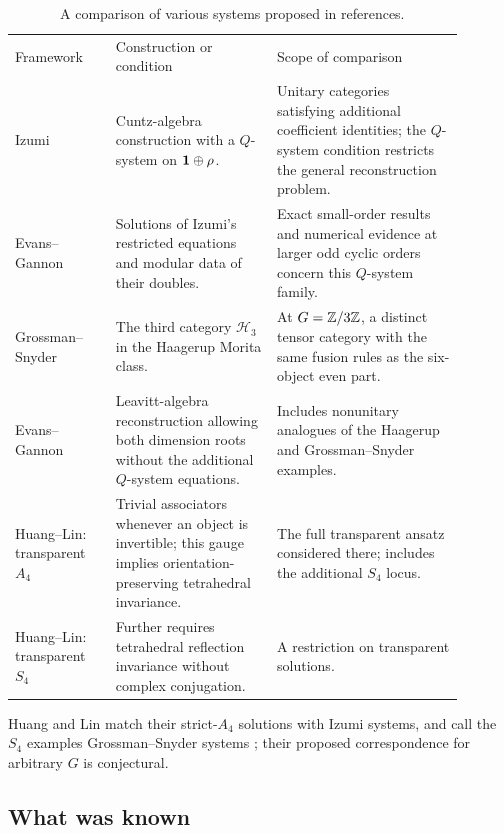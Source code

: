 \begin{table}[htbp]
\centering
\small
\setlength{\tabcolsep}{4pt}
\begin{tabular}{|p{0.20\linewidth}|p{0.32\linewidth}|p{0.37\linewidth}|}
\hline
Framework & Construction or condition & Scope of comparison\\
\hhline{|=|=|=|}
Izumi \cite{Izumi2}
& Cuntz-algebra construction with a $Q$-system on $\mathbf1\oplus\rho$.
& Unitary categories satisfying additional coefficient identities;
  the $Q$-system condition restricts the general reconstruction problem.\\
\hline
Evans--Gannon \cite{EG2011}
& Solutions of Izumi's restricted equations and modular data of their doubles.
& Exact small-order results and numerical evidence at larger odd cyclic
  orders concern this $Q$-system family.\\
\hline
\raggedright Grossman--Snyder \cite{GS}
& \raggedright The third category $\mathcal H_3$ in the Haagerup Morita class.
& At $G=\mathbb Z/3\mathbb Z$, a distinct tensor category with the same fusion
  rules as the six-object even part.\\
\hline
Evans--Gannon \cite{EG}
& Leavitt-algebra reconstruction allowing both dimension roots without
  the additional $Q$-system equations.
& Includes nonunitary analogues of the Haagerup and Grossman--Snyder
  examples.\\
\hline
Huang--Lin: transparent $A_4$ \cite{HL}
& Trivial associators whenever an object is invertible; this gauge
  implies orientation-preserving tetrahedral invariance.
& The full transparent ansatz considered there; includes the
  additional $S_4$ locus.\\
\hline
Huang--Lin: transparent $S_4$ \cite{HL}
& Further requires tetrahedral reflection invariance without complex
  conjugation.
& A restriction on transparent solutions.\\
\hline
\end{tabular}
\caption{A comparison of various systems proposed in references.}
\end{table}
Huang and Lin match their strict-$A_4$ solutions with Izumi systems,
and call the $S_4$ examples Grossman--Snyder systems
\cite[Section~6]{HL}; their proposed correspondence for arbitrary $G$
is conjectural.

\subsection*{What was known}

